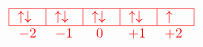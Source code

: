 \[
    \textcolor{red}{
        \begin{array}{c}
            \begin{tabular}{|m{0.5cm}|m{0.5cm}|m{0.5cm}|m{0.5cm}|m{0.5cm}|}
                \hline
                $\uparrow \downarrow$ & $\uparrow \downarrow$ & $\uparrow \downarrow$ & $\uparrow \downarrow$ & $\uparrow$ \\
                \hline
            \end{tabular} \\
            \begin{tabular}{m{0.5cm} m{0.5cm} m{0.5cm} m{0.5cm} m{0.5cm}}
                $-2$ & $-1$ & \text{ 0 } & $+1$ & $+2$
            \end{tabular}
        \end{array}
    }
\]